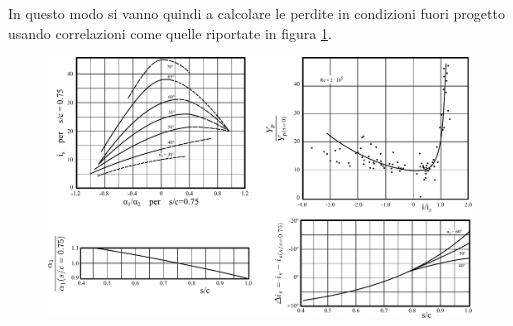 In questo modo si vanno quindi a calcolare le perdite in condizioni fuori progetto usando correlazioni come quelle riportate in figura \ref{fig:FuoriProgT1}.
\begin{figure}
\centering
  \includegraphics[width=\textwidth]{fig/FuoriProgT1.pdf}
\caption{}
\label{fig:FuoriProgT1}
\end{figure}

